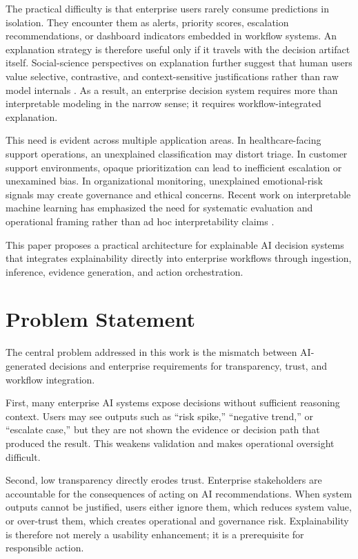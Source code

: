 \documentclass[conference]{IEEEtran}
\begin{document}
The practical difficulty is that enterprise users rarely consume predictions in isolation. They encounter them as alerts, priority scores, escalation recommendations, or dashboard indicators embedded in workflow systems. An explanation strategy is therefore useful only if it travels with the decision artifact itself. Social-science perspectives on explanation further suggest that human users value selective, contrastive, and context-sensitive justifications rather than raw model internals \cite{miller2019explanation}. As a result, an enterprise decision system requires more than interpretable modeling in the narrow sense; it requires workflow-integrated explanation.

This need is evident across multiple application areas. In healthcare-facing support operations, an unexplained classification may distort triage. In customer support environments, opaque prioritization can lead to inefficient escalation or unexamined bias. In organizational monitoring, unexplained emotional-risk signals may create governance and ethical concerns. Recent work on interpretable machine learning has emphasized the need for systematic evaluation and operational framing rather than ad hoc interpretability claims \cite{doshivelez2017rigorous}.

This paper proposes a practical architecture for explainable AI decision systems that integrates explainability directly into enterprise workflows through ingestion, inference, evidence generation, and action orchestration.

\section{Problem Statement}
The central problem addressed in this work is the mismatch between AI-generated decisions and enterprise requirements for transparency, trust, and workflow integration.

First, many enterprise AI systems expose decisions without sufficient reasoning context. Users may see outputs such as ``risk spike,'' ``negative trend,'' or ``escalate case,'' but they are not shown the evidence or decision path that produced the result. This weakens validation and makes operational oversight difficult.

Second, low transparency directly erodes trust. Enterprise stakeholders are accountable for the consequences of acting on AI recommendations. When system outputs cannot be justified, users either ignore them, which reduces system value, or over-trust them, which creates operational and governance risk. Explainability is therefore not merely a usability enhancement; it is a prerequisite for responsible action.
\end{document}
